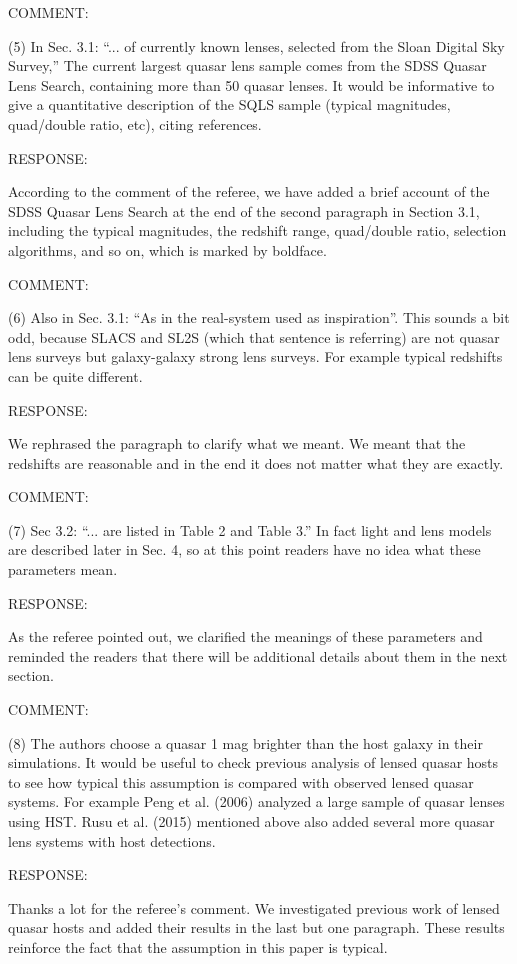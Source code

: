 \documentclass[a4paper,11pt]{article}
\begin{document}
COMMENT:

(5) In Sec. 3.1: ``... of currently known lenses, selected 
from the Sloan Digital Sky Survey,'' The current largest quasar lens sample 
comes from the SDSS Quasar Lens Search, containing more than 50 quasar lenses. 
It would be informative to give a quantitative description of the SQLS sample 
(typical magnitudes, quad/double ratio, etc), citing references.


RESPONSE:

According to the comment of the referee, we have added 
a brief account of the SDSS Quasar Lens Search 
at the end of the second paragraph in Section 3.1, 
including the typical magnitudes, the redshift range, quad/double ratio, 
selection algorithms, and so on, which is marked by boldface.

COMMENT:

(6) Also in Sec. 3.1: ``As in the real-system used as inspiration''. 
This sounds a bit odd, because SLACS and SL2S (which that sentence is referring) 
are not quasar lens surveys but galaxy-galaxy strong lens surveys. 
For example typical redshifts can be quite different.


RESPONSE:

We rephrased the paragraph to clarify what we meant. We meant that the
redshifts are reasonable and in the end it does not matter what they
are exactly.


COMMENT:

(7) Sec 3.2: ``... are listed in Table 2 and Table 3.'' In fact light and lens models 
are described later in Sec. 4, so at this point readers have no idea what these parameters mean.


RESPONSE:

As the referee pointed out, we clarified the meanings of these parameters 
and reminded the readers that there will be additional details about them 
in the next section.


COMMENT:

(8) The authors choose a quasar 1 mag brighter than the host galaxy in their simulations. 
It would be useful to check previous analysis of lensed quasar hosts 
to see how typical this assumption is compared with observed lensed quasar systems. 
For example Peng et al. (2006) analyzed a large sample of quasar lenses using HST. 
Rusu et al. (2015) mentioned above also added several more quasar lens systems with host detections.


RESPONSE:

Thanks a lot for the referee's comment. We investigated previous work of 
lensed quasar hosts and added their results in the last but one paragraph. 
These results reinforce the fact that the assumption in this paper is typical.
\end{document}
